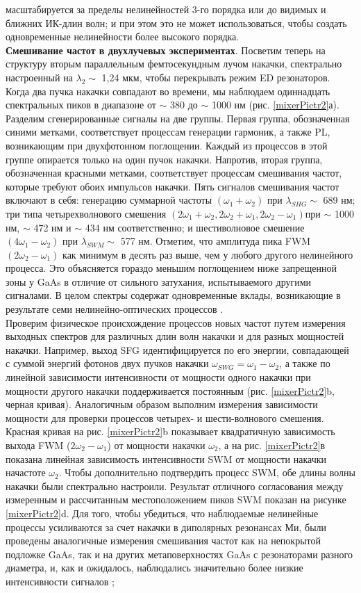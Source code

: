 масштабируется за пределы нелинейностей 3-го порядка или до видимых и ближних ИК-длин волн; и при этом это не может использоваться, чтобы создать одновременные нелинейности более высокого порядка.
\\
\hspace*{2mm}
\textbf{Смешивание частот в двухлучевых экспериментах}. Посветим теперь на структуру вторым параллельным фемтосекундным лучом накачки, спектрально настроенный на $\lambda_2 \sim$ 1,24 мкм, чтобы перекрывать режим ED резонаторов. Когда два пучка накачки совпадают во времени, мы наблюдаем одиннадцать спектральных пиков в диапазоне от $\sim$ 380 до  $\sim$ 1000 нм (рис. \ref{mixerPictr2}а). Разделим сгенерированные сигналы на две группы. Первая группа, обозначенная синими метками, соответствует процессам генерации гармоник, а также PL, возникающим при двухфотонном поглощении. Каждый из процессов в этой группе опирается только на один пучок накачки. Напротив, вторая группа, обозначенная красными метками, соответствует процессам смешивания частот, которые требуют обоих импульсов накачки. Пять сигналов смешивания частот включают в себя: генерацию суммарной частоты $(\omega_1 + \omega_2)$ при $\lambda_{SHG} \sim$ 689 нм; три типа четырехволнового смешения $(2\omega_1 + \omega_2, 2\omega_2 + \omega_1, 2\omega_2 - \omega_1)$при $\sim$ 1000 нм, $\sim$ 472 нм и $\sim$ 434 нм соответственно; и шестиволновое смешение $(4\omega_1 - \omega_2)$ при $\lambda_{SWM} \sim$ 577 нм. Отметим, что амплитуда пика FWM $(2\omega_2 - \omega_1)$ как минимум в десять раз выше, чем у любого другого нелинейного процесса. Это объясняется гораздо меньшим поглощением ниже запрещенной зоны у  GaAs в отличие от сильного затухания, испытываемого другими сигналами. В целом спектры содержат одновременные вклады, возникающие в результате семи нелинейно-оптических процессов .
\\
Проверим  физическое происхождение процессов новых частот путем измерения выходных спектров для различных длин волн накачки и для разных мощностей накачки. Например, выход SFG идентифицируется по его энергии, совпадающей с суммой энергий фотонов двух пучков накачки $\omega_{SWG} = \omega_1 - \omega_2$, а также по линейной зависимости интенсивности от мощности одного накачки при мощности другого накачки поддерживается постоянным (рис. \ref{mixerPictr2}b, черная кривая). Аналогичным образом выполним измерения зависимости мощности для проверки процессов четырех- и шести-волнового смешения. Красная кривая на рис. \ref{mixerPictr2}b показывает квадратичную зависимость выхода FWM ($2\omega_2 - \omega_1$) от мощности накачки $\omega_2$, а на рис. \ref{mixerPictr2}в показана линейная зависимость интенсивности SWM от мощности накачки начастоте $\omega_2$. Чтобы дополнительно подтвердить процесс SWM, обе длины волны накачки были спектрально настроили. Результат отличного согласования между измеренным и рассчитанным местоположением пиков SWM показан на рисунке \ref{mixerPictr2}d. Для того, чтобы убедиться, что наблюдаемые нелинейные процессы усиливаются за счет накачки в диполярных резонансах Ми, были проведены аналогичные измерения смешивания частот как на непокрытой подложке GaAs, так и на других метаповерхностях GaAs с резонаторами разного диаметра, и, как и ожидалось, наблюдались значительно более низкие интенсивности сигналов \cite{liu2018all};  
